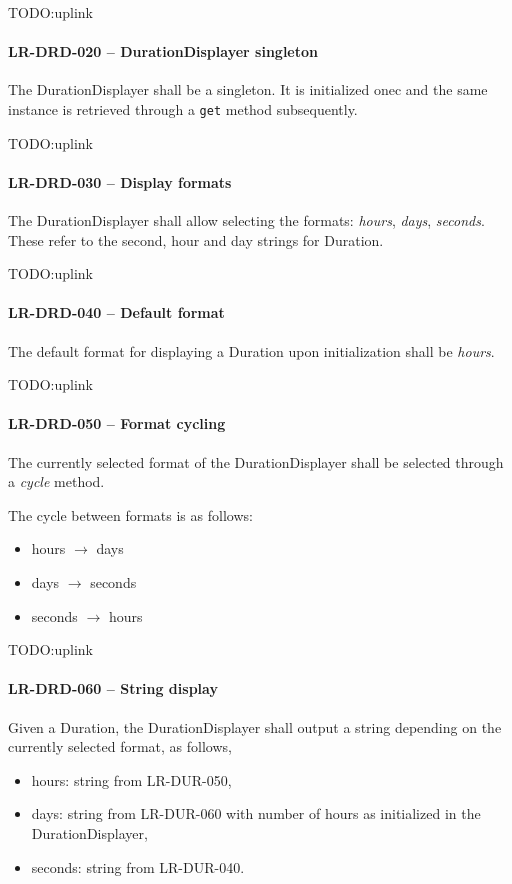 TODO:uplink
\paragraph{LR-DRD-020 -- DurationDisplayer singleton}
The DurationDisplayer shall be a singleton. It is initialized onec and
the same instance is retrieved through a \lstinline{get} method
subsequently.

TODO:uplink
\paragraph{LR-DRD-030 -- Display formats}
The DurationDisplayer shall allow selecting the formats: \emph{hours},
\emph{days}, \emph{seconds}.
These refer to the second, hour and day strings for Duration.

TODO:uplink
\paragraph{LR-DRD-040 -- Default format}
The default format for displaying a Duration upon initialization shall
be \emph{hours}.

TODO:uplink
\paragraph{LR-DRD-050 -- Format cycling}
The currently selected format of the DurationDisplayer shall be selected
through a \emph{cycle} method.

The cycle between formats is as follows:
\begin{itemize}
\item hours $\rightarrow$ days
\item days $\rightarrow$ seconds
\item seconds $\rightarrow$ hours
\end{itemize}

TODO:uplink
\paragraph{LR-DRD-060 -- String display}
Given a Duration, the DurationDisplayer shall output a string depending
on the currently selected format, as follows,
\begin{itemize}
\item hours: string from LR-DUR-050,
\item days: string from LR-DUR-060 with number of hours as initialized in the
            DurationDisplayer,
\item seconds: string from LR-DUR-040.
\end{itemize}

